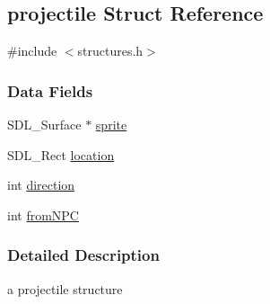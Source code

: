 \hypertarget{structprojectile}{\subsection{projectile Struct Reference}
\label{structprojectile}
}


{\ttfamily \#include $<$structures.\-h$>$}

\subsubsection*{Data Fields}
\begin{DoxyCompactItemize}
\item 
S\-D\-L\-\_\-\-Surface $\ast$ \hyperlink{structprojectile_a1c7252614a33238e51edd3bbd5fa08c5}{sprite}
\item 
S\-D\-L\-\_\-\-Rect \hyperlink{structprojectile_a08e7ab1c2395b84bea7ca13eb99bac60}{location}
\item 
int \hyperlink{structprojectile_a886d551d5381dc3e53f17825ffc51641}{direction}
\item 
int \hyperlink{structprojectile_a130dff78b354d57d5b6dadcad3e597ef}{from\-N\-P\-C}
\end{DoxyCompactItemize}


\subsubsection{Detailed Description}
a projectile structure 

